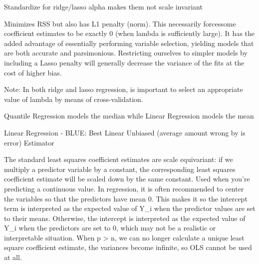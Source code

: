 \documentclass[]{book}
\begin{document}
Standardize for ridge/lasso alpha makes them not scale invariant

Minimizes RSS but also has L1 penalty (norm). This necessarily
forcessome coefficient estimates to be exactly 0 (when lambda is
sufficiently large). It has the added advantage of essentially
performing variable selection, yielding models that are both accurate
and parsimonious. Restricting ourselves to simpler models by including a
Lasso penalty will generally decrease the variance of the fits at the
cost of higher bias.

Note: In both ridge and lasso regression, is important to select an
appropriate value of lambda by means of cross-validation.

Quantile Regression models the median while Linear Regression models the
mean

Linear Regression - BLUE: Best Linear Unbiased (average amount wrong by
is error) Estimator

The standard least squares coefficient estimates are scale equivariant:
if we multiply a predictor variable by a constant, the corresponding
least squares coefficient estimate will be scaled down by the same
constant. Used when you're predicting a continuous value. In regression,
it is often recommended to center the variables so that the predictors
have mean 0. This makes it so the intercept term is interpreted as the
expected value of Y\_i when the predictor values are set to their means.
Otherwise, the intercept is interpreted as the expected value of Y\_i
when the predictors are set to 0, which may not be a realistic or
interpretable situation. When p \textgreater{} n, we can no longer
calculate a unique least square coefficient estimate, the variances
become infinite, so OLS cannot be used at all.
\end{document}
